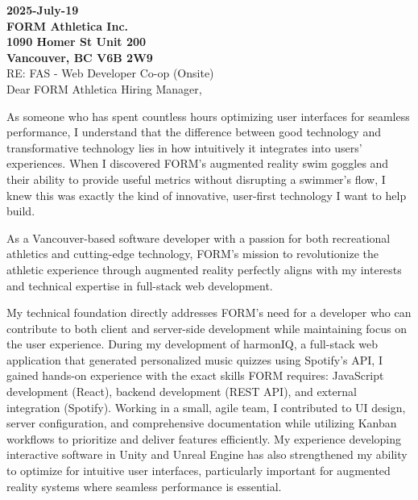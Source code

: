 \documentclass[10pt,a4paper,ragged2e,withhyper]{altacv}
\renewcommand{\personalinfofont}{\small\bfseries}
\begin{document}
\makecvheader

\vspace{1em}

{\personalinfofont
2025-July-19\\
FORM Athletica Inc.\\
1090 Homer St Unit 200\\
Vancouver, BC V6B 2W9\\

}
\vspace{1em}
RE: FAS - Web Developer Co-op (Onsite)\\
\vspace{1em}
Dear FORM Athletica Hiring Manager,\\

\vspace{1em}

As someone who has spent countless hours optimizing user interfaces for seamless performance, I understand that the difference between good technology and transformative technology lies in how intuitively it integrates into users' experiences. When I discovered FORM's augmented reality swim goggles and their ability to provide useful metrics without disrupting a swimmer's flow, I knew this was exactly the kind of innovative, user-first technology I want to help build.

As a Vancouver-based software developer with a passion for both recreational athletics and cutting-edge technology, FORM's mission to revolutionize the athletic experience through augmented reality perfectly aligns with my interests and technical expertise in full-stack web development.

\vspace{1em}


My technical foundation directly addresses FORM's need for a developer who can contribute to both client and server-side development while maintaining focus on the user experience. During my development of harmonIQ, a full-stack web application that generated personalized music quizzes using Spotify's API, I gained hands-on experience with the exact skills FORM requires: JavaScript development (React), backend development (REST API), and external integration (Spotify). Working in a small, agile team, I contributed to UI design, server configuration, and comprehensive documentation while utilizing Kanban workflows to prioritize and deliver features efficiently. My experience developing interactive software in Unity and Unreal Engine has also strengthened my ability to optimize for intuitive user interfaces, particularly important for augmented reality systems where seamless performance is essential.
\end{document}
